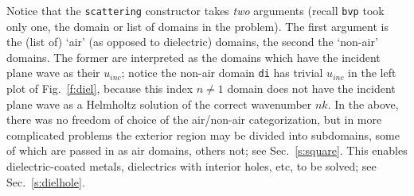 Notice that the {\tt scattering} constructor takes {\em two} arguments
(recall {\tt bvp} took only one, the domain or list of domains in the problem).
The first argument is the (list of)
`air' (as opposed to dielectric) domains, the second the `non-air' domains.
The former are interpreted as the domains which have
the incident plane wave as their $u_{inc}$;
notice the non-air domain {\tt di} has trivial $u_{inc}$ in the left plot
of Fig.~\ref{f:diel}, because this index $n\neq 1$ domain
does not have the incident plane wave as a Helmholtz solution of the
correct wavenumber $nk$.
In the above, there was no freedom of choice of the air/non-air categorization,
but in more complicated problems the exterior region may be divided into
subdomains, some of which are passed in as air domains, others not;
see Sec.~\ref{s:square}.
This enables dielectric-coated metals, dielectrics with interior holes,
etc, to be solved; see Sec.~\ref{s:dielhole}.
